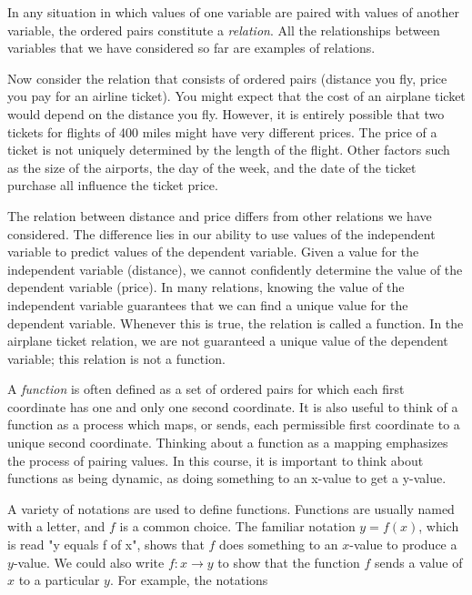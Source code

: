 \documentclass[10pt,]{book}
\theoremstyle{ptxdefinitionnotitle}
\theoremstyle{ptxdefinitiontitle}
\numberwithin{equation}{section}
\begin{document}
\hypertarget{p-17}{}%
In any situation in which values of one variable are paired with values of another variable, the ordered pairs constitute a \emph{relation}.  All the relationships between variables that we have considered so far are examples of relations.%
\par
\hypertarget{p-18}{}%
Now consider the relation that consists of ordered pairs (distance you fly, price you pay for an airline ticket). You might expect that the cost of an airplane ticket would depend on the distance you fly.  However, it is entirely possible that two tickets for flights of 400 miles might have very different prices.  The price of a ticket is not uniquely determined by the length of the flight. Other factors such as the size of the airports, the day of the week, and the date of the ticket purchase all influence the ticket price.%
\par
\hypertarget{p-19}{}%
The relation between distance and price differs from other relations we have considered.   The difference lies in our ability to use values of the independent variable to predict values of the dependent variable.  Given a value for the independent variable (distance), we cannot confidently determine the value of the dependent variable (price).  In many relations, knowing the value of the independent variable guarantees that we can find a unique value for the dependent variable.  Whenever this is true, the relation is called a function.  In the airplane ticket relation, we are not guaranteed a unique value of the dependent variable; this relation is not a function.%
\par
\hypertarget{p-20}{}%
A \emph{function} is often defined as a set of ordered pairs for which each first coordinate has one and only one second coordinate.  It is also useful to think of a function as a process which maps, or sends, each permissible first coordinate to a unique second coordinate.  Thinking about a function as a mapping emphasizes the process of pairing values.  In this course, it is important to think about functions as being dynamic, as doing something to an x-value to get a y-value.%
\par
\hypertarget{p-21}{}%
A variety of notations are used to define functions.  Functions are usually named with a letter, and \(f\) is a common choice.  The familiar notation \(y = f(x)\), which is read "y equals f of x", shows that \(f\) does something to an \(x\)-value to produce a \(y\)-value.  We could also write \(f: x \rightarrow y\) to show that the function \(f\) sends a value of \(x\) to a particular \(y\). For example, the notations%
\end{document}
